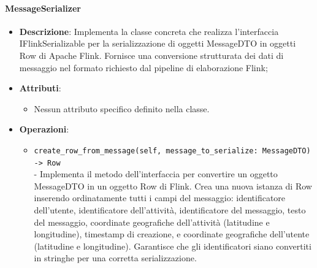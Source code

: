 \documentclass[10pt]{article}
\begin{document}
    \paragraph{MessageSerializer}
    \begin{itemize} 
    \item \textbf{Descrizione}: Implementa la classe concreta che realizza l'interfaccia IFlinkSerializable per la serializzazione di oggetti MessageDTO in oggetti Row di Apache Flink. Fornisce una conversione strutturata dei dati di messaggio nel formato richiesto dal pipeline di elaborazione Flink;
    \item \textbf{Attributi}:
    \begin{itemize}
        \item Nessun attributo specifico definito nella classe.
    \end{itemize}
    
    \item \textbf{Operazioni}:
    \begin{itemize}
        \item \texttt{create\_row\_from\_message(self, message\_to\_serialize: MessageDTO) -> Row}\\ - Implementa il metodo dell'interfaccia per convertire un oggetto MessageDTO in un oggetto Row di Flink. Crea una nuova istanza di Row inserendo ordinatamente tutti i campi del messaggio: identificatore dell'utente, identificatore dell'attività, identificatore del messaggio, testo del messaggio, coordinate geografiche dell'attività (latitudine e longitudine), timestamp di creazione, e coordinate geografiche dell'utente (latitudine e longitudine). Garantisce che gli identificatori siano convertiti in stringhe per una corretta serializzazione.
    \end{itemize}
    \end{itemize}
\end{document}
